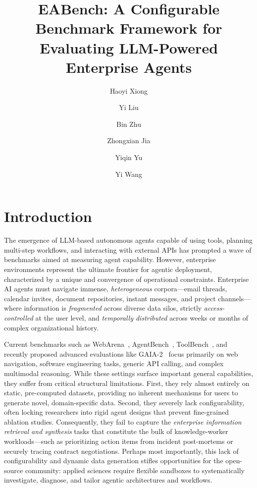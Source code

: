 \documentclass[journal,dvipsnames]{acmart}
\title{EABench: A Configurable Benchmark Framework for Evaluating LLM-Powered Enterprise Agents}
\author{Haoyi Xiong}
\affiliation{%
  \institution{Microsoft Corporation}
  \city{Beijing}
  \country{China}
}
\author{Yi Liu}
\affiliation{%
  \institution{Microsoft Corporation}
  \city{Beijing}
  \country{China}
}
\author{Bin Zhu}
\affiliation{%
  \institution{Microsoft Corporation}
  \city{Beijing}
  \country{China}
}
\author{Zhongxian Jia}
\affiliation{%
  \institution{Microsoft Corporation}
  \city{Beijing}
  \country{China}
}
\author{Yiqin Yu}
\affiliation{%
  \institution{Microsoft Corporation}
  \city{Beijing}
  \country{China}
}
\author{Yi Wang}
\affiliation{%
  \institution{Microsoft Corporation}
  \city{Beijing}
  \country{China}
}
\begin{document}
\maketitle

\section{Introduction}
\label{sec:intro}

The emergence of LLM-based autonomous agents capable of using tools, planning multi-step workflows, and interacting with external APIs has prompted a wave of benchmarks aimed at measuring agent capability. However, enterprise environments represent the ultimate frontier for agentic deployment, characterized by a unique and convergence of operational constraints. Enterprise AI agents must navigate immense, \emph{heterogeneous} corpora---email threads, calendar invites, document repositories, instant messages, and project channels---where information is \emph{fragmented} across diverse data silos, strictly \emph{access-controlled} at the user level, and \emph{temporally distributed} across weeks or months of complex organizational history.

Current benchmarks such as WebArena~\cite{zhou2023webarena},
AgentBench~\cite{liu2023agentbench}, ToolBench~\cite{qin2023toolllm}, and recently
proposed advanced evaluations like GAIA-2~\cite{gaia2} focus primarily on web navigation,
software engineering tasks, generic API calling, and complex multimodal reasoning.
While these settings surface important general capabilities, they suffer
from critical structural limitations. First, they rely almost entirely on
static, pre-computed datasets, providing no inherent mechanisms for users
to generate novel, domain-specific data. Second, they severely lack
configurability, often locking researchers into rigid agent designs that
prevent fine-grained ablation studies. Consequently, they fail to capture the
\emph{enterprise information retrieval and synthesis} tasks that constitute
the bulk of knowledge-worker workloads---such as prioritizing action items
from incident post-mortems or securely tracing contract negotiations. Perhaps
most importantly, this lack of configurability and dynamic data generation
stifles opportunities for the open-source community: applied sciences require
flexible sandboxes to systematically investigate, diagnose, and tailor
agentic architectures and workflows.
\end{document}
